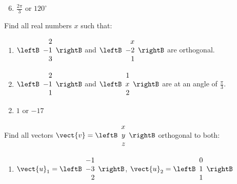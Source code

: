 \begin{multicols}{2}
\begin{ex}
\begin{sol}
\begin{enumerate}[label={\alph*.}]
\setcounter{enumi}{5}
\item  $\frac{2\pi}{3}$ or $120^\circ$


\end{enumerate}
\end{sol}
\end{ex}

\begin{ex}
Find all real numbers $x$ such that:


\begin{enumerate}[label={\alph*.}]
\item $\leftB
\begin{array}{r}
2\\
-1\\
3
\end{array}
\rightB$
and 
$\leftB
\begin{array}{r}
x\\
-2\\
1
\end{array}
\rightB$
are orthogonal.

\item $\leftB
\begin{array}{r}
2\\
-1\\
1
\end{array}
\rightB$
and 
$\leftB
\begin{array}{r}
1\\
x\\
2
\end{array}
\rightB$
are at an angle of $\frac{\pi}{3}$.

\end{enumerate}
\begin{sol}
\begin{enumerate}[label={\alph*.}]
\setcounter{enumi}{1}
\item  $1$ or $-17$

\end{enumerate}
\end{sol}
\end{ex}

\begin{ex}
Find all vectors $\vect{v} = \leftB
\begin{array}{r}
x\\
y\\
z
\end{array}
\rightB$ orthogonal to both:


\begin{enumerate}[label={\alph*.}]
\item $\vect{u}_{1} = \leftB
\begin{array}{r}
-1\\
-3\\
2
\end{array}
\rightB$,
$\vect{u}_{2} = \leftB
\begin{array}{r}
0\\
1\\
1
\end{array}
\rightB
$


\end{enumerate}
\end{ex}
\end{multicols}

